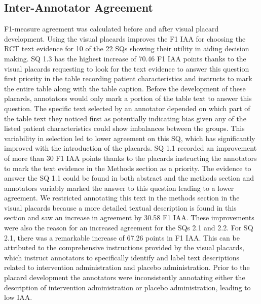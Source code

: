 \documentclass[sn-mathphys,Numbered]{sn-jnl}%
\theoremstyle{thmstyleone}%
\theoremstyle{thmstyletwo}%
\theoremstyle{thmstylethree}%
\begin{document}
\subsection{Inter-Annotator Agreement}
\label{disc:iaa}
%
F1-measure agreement was calculated before and after visual placard development.
Using the visual placards improves the F1 IAA for choosing the RCT text evidence for 10 of the 22 SQs showing their utility in aiding decision making.
SQ 1.3 has the highest increase of 70.46 F1 IAA points thanks to the visual placards requesting to look for the text evidence to answer this question first priority in the table recording patient characteristics and instructs to mark the entire table along with the table caption.
Before the development of these placards, annotators would only mark a portion of the table text to answer this question. 
The specific text selected by an annotator depended on which part of the table text they noticed first as potentially indicating bias given any of the listed patient characteristics could show imbalances between the groups.
This variability in selection led to lower agreement on this SQ, which has significantly improved with the introduction of the placards.
SQ 1.1 recorded an improvement of more than 30 F1 IAA points thanks to the placards instructing the annotators to mark the text evidence in the Methods section as a priority. 
The evidence to answer the SQ 1.1 could be found in both abstract and the methods section and annotators variably marked the answer to this question leading to a lower agreement.
We restricted annotating this text in the methods section in the visual placards because a more detailed textual description is found in this section and saw an increase in agreement by 30.58 F1 IAA.
These improvements were also the reason for an increased agreement for the SQs 2.1 and 2.2.
For SQ 2.1, there was a remarkable increase of 67.26 points in F1 IAA.
This can be attributed to the comprehensive instructions provided by the visual placards, which instruct annotators to specifically identify and label text descriptions related to intervention administration and placebo administration.
Prior to the placard development the annotators were inconsistently annotating either the description of intervention administration or placebo administration, leading to low IAA.
\end{document}
